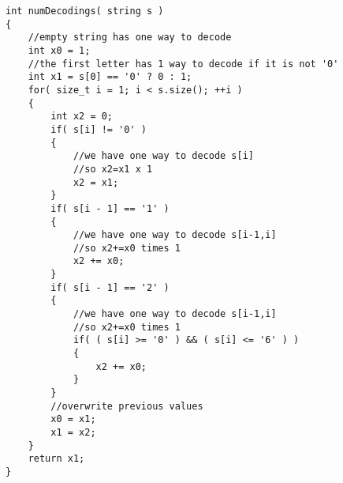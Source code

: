 \setcounter{lstlisting}{0}
\begin{lstlisting}[style=customc, caption={Dynamic Programming}]
int numDecodings( string s )
{
    //empty string has one way to decode
    int x0 = 1;
    //the first letter has 1 way to decode if it is not '0'
    int x1 = s[0] == '0' ? 0 : 1;
    for( size_t i = 1; i < s.size(); ++i )
    {
        int x2 = 0;
        if( s[i] != '0' )
        {
            //we have one way to decode s[i]
            //so x2=x1 x 1
            x2 = x1;
        }
        if( s[i - 1] == '1' )
        {
            //we have one way to decode s[i-1,i]
            //so x2+=x0 times 1
            x2 += x0;
        }
        if( s[i - 1] == '2' )
        {
            //we have one way to decode s[i-1,i]
            //so x2+=x0 times 1
            if( ( s[i] >= '0' ) && ( s[i] <= '6' ) )
            {
                x2 += x0;
            }
        }
        //overwrite previous values
        x0 = x1;
        x1 = x2;
    }
    return x1;
}
\end{lstlisting}